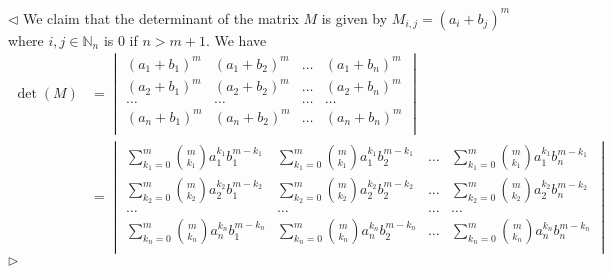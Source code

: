\documentclass[12pt]{article}
\newenvironment{solution}{\par $\triangleleft$}{$\triangleright$}
\begin{document}
\begin{solution} We claim that the determinant of the matrix $M$ is given by
    $M_{i,j}={(a_i+b_j)}^m$ where $i,j\in\mathbb{N}_n$ is $0$ if $n>m+1$. We
    have
    $$
        \begin{aligned}
            \det(M)
             & =\begin{vmatrix}
                {(a_1+b_1)}^m &
                {(a_1+b_2)}^m &
                \ldots        &
                {(a_1+b_n)}^m   \\
                {(a_2+b_1)}^m &
                {(a_2+b_2)}^m &
                \ldots        &
                {(a_2+b_n)}^m   \\
                \ldots        &
                \ldots        &
                \ldots        &
                \ldots          \\
                {(a_n+b_1)}^m &
                {(a_n+b_2)}^m &
                \ldots        &
                {(a_n+b_n)}^m   \\
            \end{vmatrix} \\
             & =\begin{vmatrix}
                \sum\limits_{k_1=0}^m\binom{m}{k_1} a_1^{k_1}b_1^{m-k_1} &
                \sum\limits_{k_1=0}^m\binom{m}{k_1} a_1^{k_1}b_2^{m-k_1} &
                \ldots                                                   &
                \sum\limits_{k_1=0}^m\binom{m}{k_1} a_1^{k_1}b_n^{m-k_1}   \\
                \sum\limits_{k_2=0}^m\binom{m}{k_2} a_2^{k_2}b_1^{m-k_2} &
                \sum\limits_{k_2=0}^m\binom{m}{k_2} a_2^{k_2}b_2^{m-k_2} &
                \ldots                                                   &
                \sum\limits_{k_2=0}^m\binom{m}{k_2} a_2^{k_2}b_n^{m-k_2}   \\
                \ldots                                                   &
                \ldots                                                   &
                \ldots                                                   &
                \ldots                                                     \\
                \sum\limits_{k_n=0}^m\binom{m}{k_n} a_n^{k_n}b_1^{m-k_n} &
                \sum\limits_{k_n=0}^m\binom{m}{k_n} a_n^{k_n}b_2^{m-k_n} &
                \ldots                                                   &
                \sum\limits_{k_n=0}^m\binom{m}{k_n} a_n^{k_n}b_n^{m-k_n}   \\

\end{vmatrix}
\end{aligned}$$
\end{solution}
\end{document}
